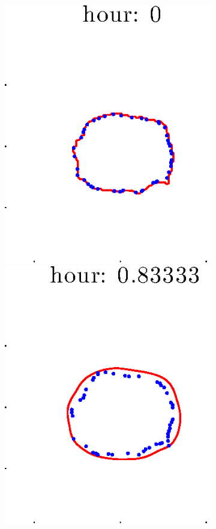 \documentclass[12pt]{article}
\begin{document}
\begin{figure}[h!]
\begin{subfigure}[b]{.3\textwidth}
	\end{subfigure}
	\begin{subfigure}[b]{.3\textwidth}
	\centering
		\includegraphics[height=.15\textheight]{Pos10exp2/firsthalf/second1.eps}
		\includegraphics[height=.15\textheight]{Pos10exp2/firsthalf/second2.eps}

\end{subfigure}
\end{figure}
\end{document}
